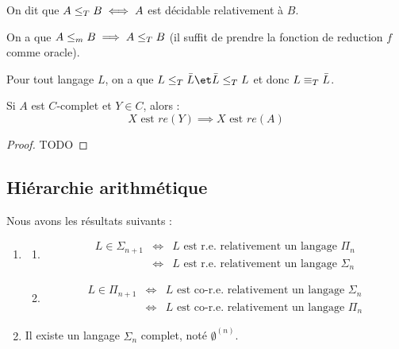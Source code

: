 \begin{definition}
	On dit que $A \leq_T B \iff A$ est décidable relativement à $B$.
\end{definition}

\begin{remarque}
	On a que $A \leq_m B \implies A \leq_T B$ (il suffit de prendre la fonction de reduction $f$ comme oracle).
\end{remarque}

\begin{remarque}
	Pour tout langage $L$, on a que $L \leqt \bar L \et \bar L \leqt L$ et donc $L \equiv_T \bar L$.
\end{remarque}


\begin{lemma}
	Si $A$ est $C$-complet et $Y \in C$, alors :
	$$X \text{ est } re(Y) \implies X \text{ est } re(A)$$
\end{lemma}

\begin{proof}
	TODO
\end{proof}


\subsection{Hiérarchie arithmétique}

\begin{theorem}[de Post]
	Nous avons les résultats suivants :
	\begin{enumerate}
		\item \label{thm:post-1}
		      \begin{enumerate}
			      \item \label{thm:post-1a}
			            \begin{eqnarray*}
				            L \in \Sigma_{n+1} &\iff& L \text{ est r.e. relativement  un langage }  \Pi_n  \\
				            &\iff& L \text{ est r.e. relativement  un langage }  \Sigma_{n}
			            \end{eqnarray*}

			      \item
			            \begin{eqnarray*}
				            L \in \Pi_{n+1} &\iff& L \text{ est co-r.e. relativement  un langage }  \Sigma_n  \\
				            &\iff& L \text{ est co-r.e. relativement  un langage }  \Pi_n
			            \end{eqnarray*}
		      \end{enumerate}

		\item Il existe un langage $\Sigma_n$ complet, noté $\emptyset^{(n)}$. \label{thm:post-2}
	\end{enumerate}
\end{theorem}


